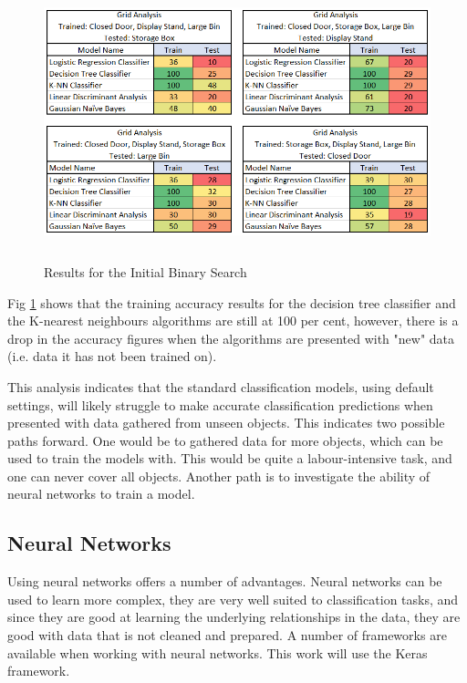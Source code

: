 \documentclass{svproc}
\begin{document}
\begin{figure}[ht]
\includegraphics[width=12cm, height=8cm]{images/new_data_results.png}
\centering
\caption{Results for the Initial Binary Search}
\label{fig:new_data_results}
\end{figure}

Fig \ref{fig:new_data_results} shows that the training accuracy results for the decision tree classifier and the K-nearest neighbours 
algorithms are still at 100 per cent, however, there is a drop in the accuracy figures when the algorithms are presented with "new" data 
(i.e. data it has not been trained on).

This analysis indicates that the standard classification models, using default settings, will likely struggle to make accurate 
classification predictions when presented with data gathered from unseen objects. This indicates two possible paths forward. One would be to 
gathered data for more objects, which can be used to train the models with. This would be quite a labour-intensive task, and one can never 
cover all objects. Another path is to investigate the ability of neural networks to train a model. 

\subsection{Neural Networks}
Using neural networks offers a number of advantages. Neural networks can be used to learn more complex, they are very well suited to 
classification tasks, and since they are good at learning the underlying relationships in the data, they are good with data that is not 
cleaned and prepared. A number of frameworks are available when working with neural networks. This work will use the Keras framework.
\end{document}
